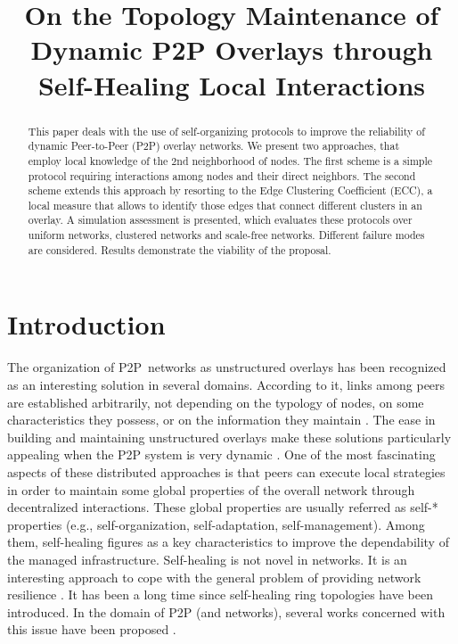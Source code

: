 \documentclass[10pt, conference, compsocconf]{IEEEtran}
\begin{document}
 
\title{On the Topology Maintenance of Dynamic P2P Overlays through Self-Healing Local Interactions}
\author{
}

\maketitle              
\begin{abstract}
This paper deals with the use of self-organizing protocols to improve the reliability of dynamic Peer-to-Peer (P2P) overlay networks. We present two approaches, that employ local knowledge of the $2$nd neighborhood of nodes. The first scheme is a simple protocol requiring interactions among nodes and their direct neighbors. The second scheme extends this approach by resorting to the Edge Clustering Coefficient (ECC), a local measure that allows to identify those edges that connect different clusters in an overlay. A simulation assessment is presented, which evaluates these protocols over uniform networks, clustered networks and scale-free networks. Different failure modes are considered. Results demonstrate the viability of the proposal.
\end{abstract}

\section{Introduction}

The organization of \ac{P2P}~networks as unstructured overlays has been recognized as an interesting solution in several domains. According to it, links among peers are established arbitrarily, not depending on the typology of nodes, on some characteristics they possess, or on the information they maintain \cite{Luciano1,EberspacherS05a,simplex,Leitao}.
The ease in building and maintaining unstructured overlays make these solutions particularly appealing when the P2P system is very dynamic \cite{gridpeer,shimada}. 
One of the most fascinating aspects of these distributed approaches is that peers can execute local strategies in order to maintain some global properties of the overall network through decentralized interactions. These global properties are usually referred as self-* properties (e.g., self-organization, self-adaptation, self-management). Among them, self-healing figures as a key characteristics to improve the dependability of the managed infrastructure.
Self-healing is not novel in networks. It is an interesting approach to cope with the general problem of providing network resilience \cite{doerr}.
It has been a long time since self-healing ring topologies have been introduced.
In the domain of P2P (and networks), several works concerned with this issue have been proposed \cite{chaudhry,simplex,Pournarasb}.
\end{document}
